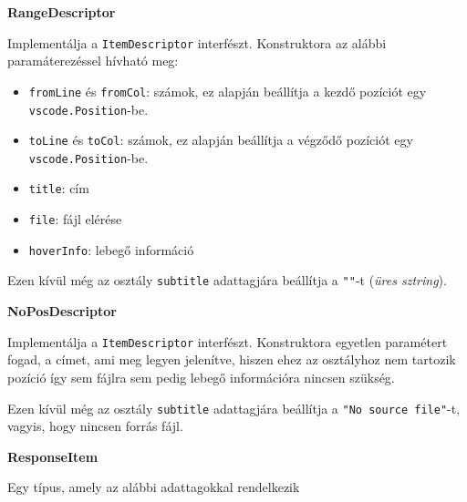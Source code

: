 \vspace{14pt}
\noindent \textbf{RangeDescriptor}


\noindent Implementálja a \lstinline{ItemDescriptor} interfészt. Konstruktora az alábbi paramáterezéssel hívható meg: 

\begin{itemize}
    \item \lstinline{fromLine} és \lstinline{fromCol}: számok, ez alapján beállítja a kezdő pozíciót egy \lstinline{vscode.Position}-be.
    
    \item \lstinline{toLine} és \lstinline{toCol}: számok, ez alapján beállítja a végződő pozíciót egy \lstinline{vscode.Position}-be.
    
    \item \lstinline{title}: cím
    
    \item \lstinline{file}: fájl elérése
    
    \item \lstinline{hoverInfo}: lebegő információ

\end{itemize}

\noindent Ezen kívül még az osztály \lstinline{subtitle} adattagjára beállítja a \lstinline{""}-t (\textit{üres sztring}).



\vspace{14pt}
\noindent \textbf{NoPosDescriptor}


\noindent Implementálja a \lstinline{ItemDescriptor} interfészt. Konstruktora egyetlen paramétert fogad, a címet, ami meg legyen jelenítve, hiszen ehez az osztályhoz nem tartozik pozíció így sem fájlra sem pedig lebegő információra nincsen szükség.

\noindent Ezen kívül még az osztály \lstinline{subtitle} adattagjára beállítja a \lstinline{"No source file"}-t, vagyis, hogy nincsen forrás fájl.







\vspace{14pt}
\noindent \textbf{ResponseItem}


\noindent Egy típus, amely az alábbi adattagokkal rendelkezik


